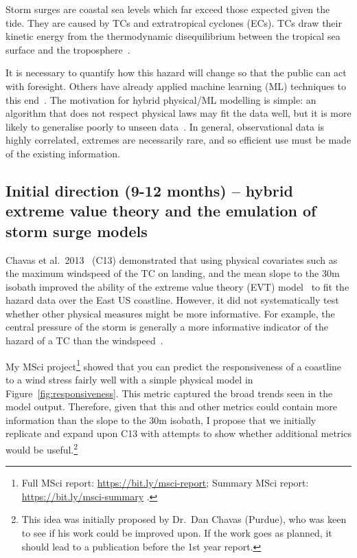 \documentclass[usenames, dvipsnames]{article}      %
\begin{document}
Storm surges are coastal sea levels which
far exceed those expected given the tide.
They are caused by TCs and extratropical cyclones (ECs).
TCs draw their kinetic energy from the thermodynamic
disequilibrium between the tropical sea surface and the
troposphere~\cite{emanuel1986air, emanuel1987dependence}.

It is necessary to quantify how this hazard will
change so that the public can act with foresight.
Others have already applied machine learning (ML) techniques to
this end~\cite{kulp2019new, kulp2018coastaldem, tadesse2020data}.
The motivation for hybrid physical/ML modelling is simple:
an algorithm that does not respect physical laws may fit
the data well, but it is more likely to generalise
poorly to unseen data~\cite{beucler2019achieving}. 
In general, observational data is highly correlated, 
extremes are necessarily rare, and so efficient use
must be made of the existing information.\vspace{-5pt}

\subsection*{Initial direction (9-12 months) -- hybrid extreme value theory 
            and the emulation of storm surge models}

\vspace{-10pt}
Chavas et al.~2013~\cite{Chavas2013U.S.Perspective} (C13)
demonstrated that using physical covariates such as
the maximum windspeed of the TC on landing,
and the mean slope to the 30m isobath improved the ability
of the extreme value theory (EVT) model~\cite{coles2001introduction}
to fit the hazard data over the East US coastline.
However, it did not systematically test whether
other physical measures might be more informative.
For example, the central pressure of the storm is generally
a more informative indicator of the hazard of a TC than the windspeed~\cite{Chavas2017PhysicalRelationship}.

 My MSci project\footnote{
 Full MSci report: \url{https://bit.ly/msci-report}; 
 Summary MSci report: \url{https://bit.ly/msci-summary}
 .} 
 showed that you can predict the
 responsiveness of a coastline to a wind stress fairly well with a
 simple physical model in Figure~\ref{fig:responsiveness}.
 This metric captured the broad trends seen in the model output.
 Therefore, given that this and other metrics could contain more
 information than the slope to the 30m isobath, I propose that we
 initially replicate and expand upon C13 with attempts to show whether
 additional metrics would be useful.\footnote{This idea was initially
 proposed by Dr.~Dan Chavas (Purdue), who was keen to see if his work could be
 improved upon. If the work goes as planned, it should lead to a publication before the 1st year report.}
\end{document}
